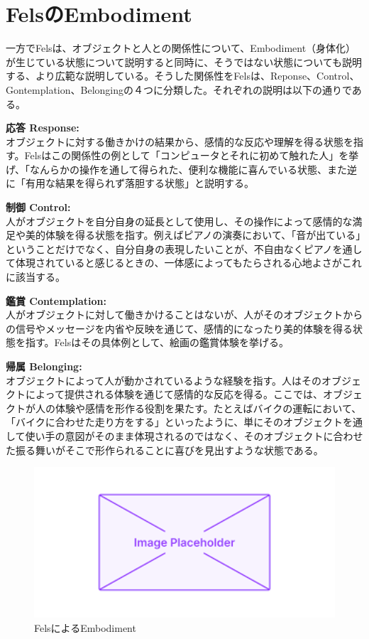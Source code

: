 \section{FelsのEmbodiment}
一方でFelsは、オブジェクトと人との関係性について、Embodiment（身体化）が生じている状態について説明すると同時に、そうではない状態についても説明する、より広範な説明している。そうした関係性をFelsは、Reponse、Control、Gontemplation、Belongingの４つに分類した。それぞれの説明は以下の通りである。

\textbf{応答 Response:}\\
オブジェクトに対する働きかけの結果から、感情的な反応や理解を得る状態を指す。Felsはこの関係性の例として「コンピュータとそれに初めて触れた人」を挙げ、「なんらかの操作を通して得られた、便利な機能に喜んでいる状態、また逆に「有用な結果を得られず落胆する状態」と説明する。

\textbf{制御 Control:}\\
人がオブジェクトを自分自身の延長として使用し、その操作によって感情的な満足や美的体験を得る状態を指す。例えばピアノの演奏において、「音が出ている」ということだけでなく、自分自身の表現したいことが、不自由なくピアノを通して体現されていると感じるときの、一体感によってもたらされる心地よさがこれに該当する。

\textbf{鑑賞 Contemplation:}\\
人がオブジェクトに対して働きかけることはないが、人がそのオブジェクトからの信号やメッセージを内省や反映を通じて、感情的になったり美的体験を得る状態を指す。Felsはその具体例として、絵画の鑑賞体験を挙げる。

\textbf{帰属 Belonging:}\\
オブジェクトによって人が動かされているような経験を指す。人はそのオブジェクトによって提供される体験を通じて感情的な反応を得る。ここでは、オブジェクトが人の体験や感情を形作る役割を果たす。たとえばバイクの運転において、「バイクに合わせた走り方をする」といったように、単にそのオブジェクトを通して使い手の意図がそのまま体現されるのではなく、そのオブジェクトに合わせた振る舞いがそこで形作られることに喜びを見出すような状態である。

\begin{figure}[H]
  \centering
  \includegraphics[width=15cm]{img/placeholder.png}
  \caption{FelsによるEmbodiment}
  \label{fig:fels_embodiment}
\end{figure}

